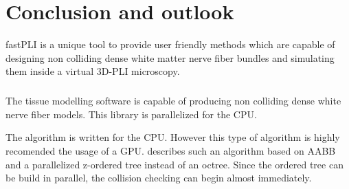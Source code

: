 \setcounter{chapter}{8}
\chapter{Conclusion and outlook}
\label{sec:summary}
% 
\ac{fastPLI} is a unique tool to provide user friendly methods which are capable of designing non colliding dense white matter nerve fiber bundles and simulating them inside a virtual \ac{3D-PLI} microscopy.
% 
\paragraph{}
The tissue modelling software is capable of producing non colliding dense white nerve fiber models.
This library is parallelized for the \ac{CPU}.
\par
The algorithm is written for the \ac{CPU}. However this type of algorithm is highly recomended the usage of a \ac{GPU}.
\cite{Karras2012} describes such an algorithm based on \ac{AABB} and a parallelized z-ordered tree instead of an octree.
Since the \-ordered tree can be build in parallel, the collision checking can begin almost immediately.
% 
